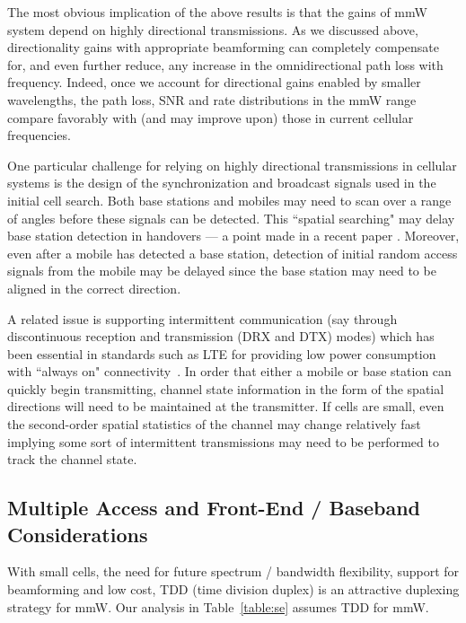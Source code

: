 \documentclass[journal]{IEEEtran}
\begin{document}
The most obvious implication of the above results
is that the gains of mmW system depend on highly directional transmissions.
As we discussed above, directionality gains with appropriate beamforming
can completely compensate for, and even further reduce, any increase in the
omnidirectional path loss with frequency.
Indeed, once we account for directional gains enabled by smaller wavelengths,
the path loss, SNR and rate distributions in the mmW range
compare favorably with (and may improve upon)  those in current cellular frequencies.

One particular challenge for relying on
highly directional transmissions in cellular systems
is the design of the synchronization and broadcast signals used in the
initial cell search.
Both base stations and mobiles may need to scan over a range of angles
before these signals can be detected.
This ``spatial searching" may delay base station detection in handovers
--- a point made in a recent paper \cite{LimmWBooster:13}.
Moreover, even after a mobile has detected a base station,
detection of initial random access signals from the mobile may be delayed
since the base station may need to be aligned in the correct direction.

A related issue is supporting intermittent communication
(say through discontinuous reception and transmission (DRX and DTX) modes)
which has been essential in standards such as LTE
for providing low power consumption with ``always on" connectivity~\cite{bontu2009drx}.
In order that either a mobile or base station can quickly begin transmitting,
channel state information in the form of
the spatial directions will need to be maintained at the transmitter.
If cells are small, even the second-order spatial statistics of the channel
may change relatively fast implying some sort of intermittent transmissions
may need to be performed to track the channel state.


\subsection{Multiple Access and Front-End / Baseband Considerations} \label{sec:multAccess}

With small cells, the need for future spectrum / bandwidth flexibility,
support for beamforming and
low cost, TDD (time division duplex) is an attractive duplexing strategy for mmW.
Our analysis in Table~\ref{table:se} assumes TDD for mmW.
\end{document}
